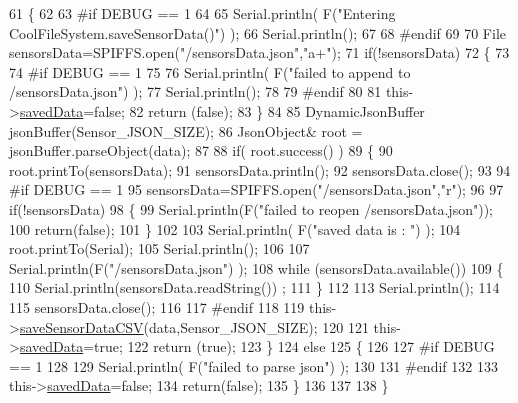 \begin{DoxyCode}
61 \{
62 
63 \textcolor{preprocessor}{#if DEBUG == 1}
64 
65     Serial.println( F(\textcolor{stringliteral}{"Entering CoolFileSystem.saveSensorData()"}) );
66     Serial.println();
67 
68 \textcolor{preprocessor}{#endif}
69     
70     File sensorsData=SPIFFS.open(\textcolor{stringliteral}{"/sensorsData.json"},\textcolor{stringliteral}{"a+"});
71     \textcolor{keywordflow}{if}(!sensorsData)
72     \{
73     
74 \textcolor{preprocessor}{    #if DEBUG == 1}
75     
76         Serial.println( F(\textcolor{stringliteral}{"failed to append to /sensorsData.json"}) );
77         Serial.println();
78     
79 \textcolor{preprocessor}{    #endif}
80 
81         this->\hyperlink{classCoolFileSystem_ad398e0c5c41a0c88acdf5d672aa71351}{savedData}=\textcolor{keyword}{false};
82         \textcolor{keywordflow}{return} (\textcolor{keyword}{false}); 
83     \}   
84 
85     DynamicJsonBuffer jsonBuffer(Sensor\_JSON\_SIZE);
86     JsonObject& root = jsonBuffer.parseObject(data);
87 
88     \textcolor{keywordflow}{if}( root.success() )
89     \{
90         root.printTo(sensorsData);
91         sensorsData.println();
92         sensorsData.close();
93 
94 \textcolor{preprocessor}{    #if DEBUG == 1}
95         sensorsData=SPIFFS.open(\textcolor{stringliteral}{"/sensorsData.json"},\textcolor{stringliteral}{"r"});
96         
97         \textcolor{keywordflow}{if}(!sensorsData)
98         \{
99             Serial.println(F(\textcolor{stringliteral}{"failed to reopen /sensorsData.json"}));
100             \textcolor{keywordflow}{return}(\textcolor{keyword}{false});              
101         \}
102     
103         Serial.println( F(\textcolor{stringliteral}{"saved data is : "}) );
104         root.printTo(Serial);
105         Serial.println();
106 
107         Serial.println(F(\textcolor{stringliteral}{"/sensorsData.json"}) );
108         \textcolor{keywordflow}{while} (sensorsData.available()) 
109         \{
110             Serial.println(sensorsData.readString()) ;
111         \}
112         
113         Serial.println();
114         
115         sensorsData.close();
116     
117 \textcolor{preprocessor}{    #endif}
118 
119         this->\hyperlink{classCoolFileSystem_af5a51e2b9bb6e7e7edf75a508fe75f82}{saveSensorDataCSV}(data,Sensor\_JSON\_SIZE);        
120 
121         this->\hyperlink{classCoolFileSystem_ad398e0c5c41a0c88acdf5d672aa71351}{savedData}=\textcolor{keyword}{true};
122         \textcolor{keywordflow}{return} (\textcolor{keyword}{true});      
123     \}
124     \textcolor{keywordflow}{else}
125     \{
126     
127 \textcolor{preprocessor}{    #if DEBUG == 1}
128 
129         Serial.println( F(\textcolor{stringliteral}{"failed to parse json"}) );
130     
131 \textcolor{preprocessor}{    #endif}
132 
133         this->\hyperlink{classCoolFileSystem_ad398e0c5c41a0c88acdf5d672aa71351}{savedData}=\textcolor{keyword}{false};
134         \textcolor{keywordflow}{return}(\textcolor{keyword}{false});
135     \}
136     
137 
138 \}
\end{DoxyCode}
